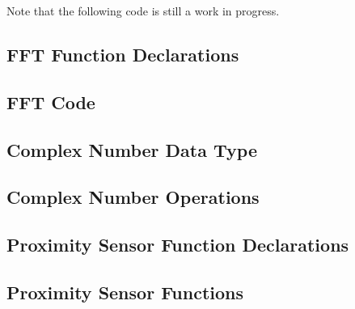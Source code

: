 \documentclass[10pt]{article}           %
\begin{document}
Note that the following code is still a work in progress.

\subsection{FFT Function Declarations}
\label{sub:fft_function_declarations}



\subsection{FFT Code}
\label{sub:fft_code}



\subsection{Complex Number Data Type}
\label{sub:complex_number_data_type}



\subsection{Complex Number Operations}
\label{sub:complex_number_operations}



\subsection{Proximity Sensor Function Declarations}
\label{sub:proximity_sensor_function_declarations}



\subsection{Proximity Sensor Functions}
\label{sub:proximity_sensor_functions}


\end{document}
